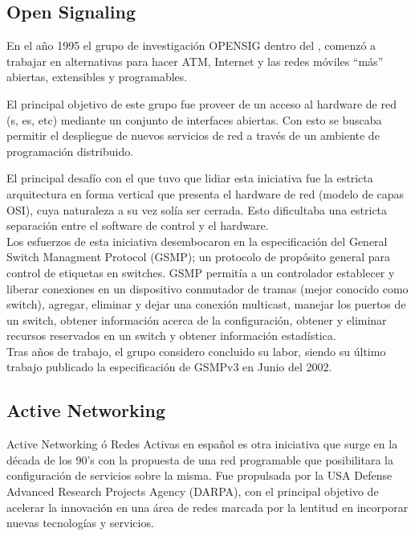 \subsection{Open Signaling}
En el año 1995 el grupo de investigación OPENSIG\cite{campbell1999open} dentro del , comenzó a trabajar en alternativas para hacer ATM, Internet y las redes móviles ``más'' abiertas, extensibles y programables.

El principal objetivo de este grupo fue proveer de un acceso al hardware de red (s, es, etc) mediante un conjunto de interfaces abiertas. Con esto se buscaba permitir el despliegue de nuevos servicios de red a través de un ambiente de programación distribuido.

El principal desafío con el que tuvo que lidiar esta iniciativa fue la estricta arquitectura en forma vertical que presenta el hardware de red (modelo de capas OSI), cuya naturaleza a su vez solía ser cerrada. Esto dificultaba una estricta separación entre el software de control y el hardware.\\

Los esfuerzos de esta iniciativa desembocaron en la especificación del General Switch Managment Protocol (GSMP); un protocolo de propósito general para control de etiquetas en switches.
GSMP permitía a un controlador establecer y liberar conexiones en un dispositivo conmutador de tramas (mejor conocido como switch), agregar, eliminar y dejar una conexión multicast, manejar los puertos de un switch, obtener información acerca de la configuración, obtener y eliminar recursos reservados en un switch y obtener información estadística.\\

Tras años de trabajo, el grupo considero concluido su labor, siendo su último trabajo publicado la especificación de GSMPv3 en Junio del 2002\cite{doria2002general}.

\subsection{Active Networking}
Active Networking\citep{tennenhouse1997survey}\citep{tennenhouse2002towards}\citep{moore2001towards} \'o Redes Activas en español es otra iniciativa que surge en la década de los 90's con la propuesta de una red programable que posibilitara la configuración de servicios sobre la misma. Fue propulsada por la USA Defense Advanced Research Projects Agency (DARPA), con el principal objetivo de acelerar la innovación en una área de redes marcada por la lentitud en incorporar nuevas tecnologías y servicios.\\

